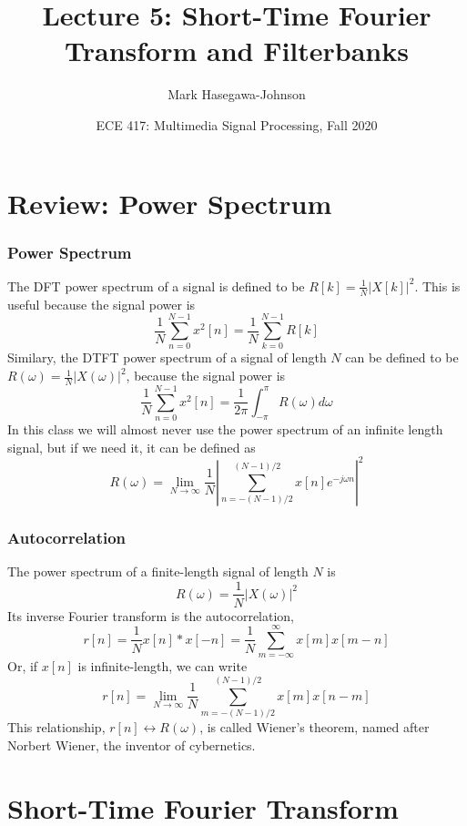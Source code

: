 \documentclass{beamer}
\title{Lecture 5: Short-Time Fourier Transform and Filterbanks}
\author{Mark Hasegawa-Johnson}
\date{ECE 417: Multimedia Signal Processing, Fall 2020}
\begin{document}
\begin{frame}
  \maketitle
\end{frame}

\begin{frame}
  \tableofcontents
\end{frame}

\section[Review]{Review: Power Spectrum}
\setcounter{subsection}{1}

\begin{frame}
  \frametitle{Power Spectrum}

  The DFT power spectrum of a signal is defined to be $R[k]=\frac{1}{N}|X[k]|^2$.  This is
  useful because the signal power is
  \[
  \frac{1}{N}\sum_{n=0}^{N-1}x^2[n] = \frac{1}{N} \sum_{k=0}^{N-1}R[k]
  \]  
  Similary, the DTFT power spectrum of a signal of length $N$ can be defined to be
  $R(\omega)=\frac{1}{N}|X(\omega)|^2$, because the signal power is
  \[
  \frac{1}{N}\sum_{n=0}^{N-1}x^2[n] = \frac{1}{2\pi}\int_{-\pi}^{\pi}R(\omega)d\omega
  \]
  In this class we will almost never use the power spectrum of an
  infinite length signal, but if we need it, it can be defined as
  \[
  R(\omega) = \lim_{N\rightarrow\infty}\frac{1}{N}\left|\sum_{n=-(N-1)/2}^{(N-1)/2} x[n]e^{-j\omega n}\right|^2
  \]
\end{frame}

\begin{frame}
  \frametitle{Autocorrelation}
  The power spectrum of a finite-length signal of length $N$ is
  \[
  R(\omega)=\frac{1}{N}|X(\omega)|^2
  \]
  Its inverse Fourier transform is the autocorrelation,
  \[
  r[n] = \frac{1}{N}x[n]\ast x[-n]  = \frac{1}{N}\sum_{m=-\infty}^\infty  x[m] x[m-n]
  \]
  Or, if $x[n]$ is infinite-length, we can write
  \[
  r[n] = \lim_{N\rightarrow\infty}\frac{1}{N}\sum_{m=-(N-1)/2}^{(N-1)/2}x[m]x[n-m]
  \]
  This relationship, $r[n]\leftrightarrow R(\omega)$, is called
  Wiener's theorem, named after Norbert Wiener, the inventor of
  cybernetics.
\end{frame}

\section[STFT]{Short-Time Fourier Transform}
\setcounter{subsection}{1}
\end{document}
